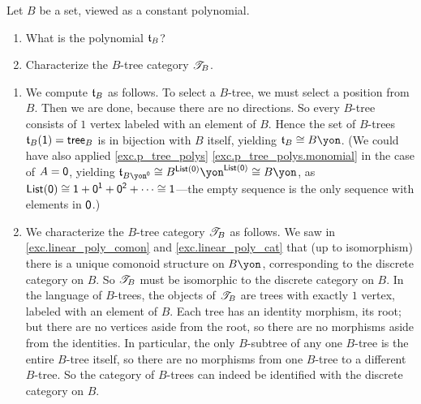 \documentclass[Book-Poly]{subfiles}
\begin{document}
\begin{exercise}
Let $B$ be a set, viewed as a constant polynomial.
\begin{enumerate}
	\item What is the polynomial $\mathfrak{t}_B$?
	\item Characterize the $B$-tree category $\mathscr{T}_{B}$.
\qedhere
\end{enumerate}
\begin{solution}
\begin{enumerate}
    \item We compute $\mathfrak{t}_B$ as follows.
    To select a $B$-tree, we must select a position from $B$.
    Then we are done, because there are no directions.
    So every $B$-tree consists of $1$ vertex labeled with an element of $B$.
    Hence the set of $B$-trees $\mathfrak{t}_B(\textsf{1})=\mathsf{tree}_B$ is in bijection with $B$ itself, yielding $\car{t}_B\iso B\yon$.
    (We could have also applied \cref{exc.p_tree_polys} \cref{exc.p_tree_polys.monomial} in the case of $A=\textsf{0}$, yielding $\car{t}_{B\yon^\0}\iso B^{\lst(\0)}\yon^{\lst(\0)}\iso B\yon$, as $\mathsf{List}(\textsf{0})\cong\textsf{1}+\textsf{0}^{\textsf{1}}+\textsf{0}^{\textsf{2}}+\cdots\cong\textsf{1}$---the empty sequence is the only sequence with elements in $\textsf{0}$.)
    \item We characterize the $B$-tree category $\mathscr{T}_{B}$ as follows.
    We saw in \cref{exc.linear_poly_comon} and \cref{exc.linear_poly_cat} that (up to isomorphism) there is a unique comonoid structure on $B\yon$, corresponding to the discrete category on $B$.
    So $\mathscr{T}_{B}$ must be isomorphic to the discrete category on $B$.
    In the language of $B$-trees, the objects of $\mathscr{T}_{B}$ are trees with exactly $1$ vertex, labeled with an element of $B$.
    Each tree has an identity morphism, its root; but there are no vertices aside from the root, so there are no morphisms aside from the identities.
    In particular, the only $B$-subtree of any one $B$-tree is the entire $B$-tree itself, so there are no morphisms from one $B$-tree to a different $B$-tree.
    So the category of $B$-trees can indeed be identified with the discrete category on $B$.
\end{enumerate}
\end{solution}
\end{exercise}
\end{document}
